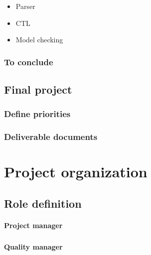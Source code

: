 \documentclass{report}
\begin{document}
\vspace{4mm}
\begin{itemize}
\item Parser\vspace{1mm}
\item CTL\vspace{1mm}
\item Model checking\vspace{1mm}
\end{itemize}

\subsection{To conclude}

\section{Final project}

\subsection{Define priorities}

\subsection{Deliverable documents}

\chapter{Project organization}

\section{Role definition}

\subsubsection{Project manager}

\paragraph{}
\hspace{4mm}\textnormal{}

\subsubsection{Quality manager}
\end{document}
